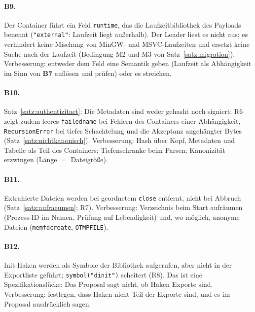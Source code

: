 \documentclass[a4paper,12pt,twoside]{report}
\DeclareRobustCommand{\_}{\ifmmode\mbox{\textunderscore}\else\textunderscore\allowbreak{}\fi}
\theoremstyle{definition}
\newcommand{\Bf}[1]{\textbf{B#1}}
\begin{document}
\paragraph{\Bf{9}.} Der Container führt ein Feld \texttt{runtime}, das die Laufzeitbibliothek des Payloads benennt (\texttt{"external"}: Laufzeit liegt außerhalb). Der Loader liest es nicht aus; es verhindert keine Mischung von MinGW- und MSVC-Laufzeiten und ersetzt keine Suche nach der Laufzeit (Bedingung M2 und M3 von Satz~\ref{satz:migration}). Verbesserung: entweder dem Feld eine Semantik geben (Laufzeit als Abhängigkeit im Sinn von \Bf{7} auflösen und prüfen) oder es streichen.

\paragraph{\Bf{10}.} Satz~\ref{satz:authentizitaet}: Die Metadaten sind weder gehasht noch signiert; R6 zeigt zudem leeres \texttt{failed\_name} bei Fehlern des Containers einer Abhängigkeit, \texttt{RecursionError} bei tiefer Schachtelung und die Akzeptanz angehängter Bytes (Satz~\ref{satz:nichtkanonisch}). Verbesserung: Hash über Kopf, Metadaten und Tabelle als Teil des Containers; Tiefenschranke beim Parsen; Kanonizität erzwingen (Länge $=$ Dateigröße).

\paragraph{\Bf{11}.} Extrahierte Dateien werden bei geordnetem \texttt{close} entfernt, nicht bei Abbruch (Satz~\ref{satz:aufraeumen}; R7). Verbesserung: Verzeichnis beim Start aufräumen (Prozess-ID im Namen, Prüfung auf Lebendigkeit) und, wo möglich, anonyme Dateien (\texttt{memfd\_create}, \texttt{O\_TMPFILE}).

\paragraph{\Bf{12}.} Init-Haken werden als Symbole der Bibliothek aufgerufen, aber nicht in der Exportliste geführt; \texttt{symbol("d\_init")} scheitert (R8). Das ist eine Spezifikationslücke: Das Proposal sagt nicht, ob Haken Exporte sind. Verbesserung: festlegen, dass Haken nicht Teil der Exporte sind, und es im Proposal ausdrücklich sagen.
\end{document}
